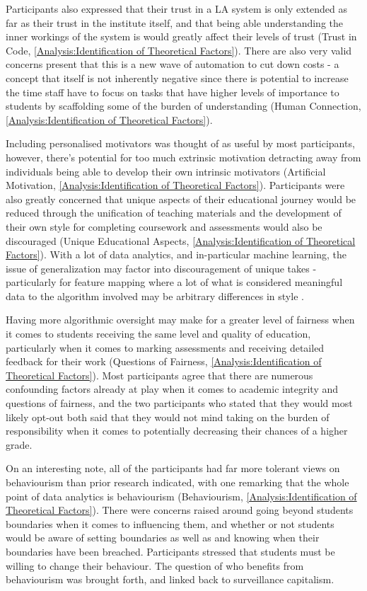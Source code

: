\documentclass{l4proj}
\begin{document}
Participants also expressed that their trust in a LA system is only extended as far as their trust in the institute itself, and that being able understanding the inner workings of the system is would greatly affect their levels of trust (Trust in Code, \ref{Analysis:Identification of Theoretical Factors}). There are also very valid concerns present that this is a new wave of automation to cut down costs - a concept that itself is not inherently negative since there is potential to increase the time staff have to focus on tasks that have higher levels of importance to students by scaffolding some of the burden of understanding (Human Connection, \ref{Analysis:Identification of Theoretical Factors}). 

Including personalised motivators was thought of as useful by most participants, however, there’s potential for too much extrinsic motivation detracting away from individuals  being able to develop their
own intrinsic motivators (Artificial Motivation, \ref{Analysis:Identification of Theoretical Factors}). Participants were also greatly concerned that unique aspects of their educational journey would be reduced through the unification of teaching materials and the development of their own style for completing coursework and assessments would also be discouraged (Unique Educational Aspects, \ref{Analysis:Identification of Theoretical Factors}). With a lot of data analytics, and in-particular machine learning, the issue of generalization may factor into discouragement of unique takes - particularly for feature mapping where a lot of what is considered meaningful data to the algorithm involved may be arbitrary differences in style \citep{zhang2021understanding}. 

Having more algorithmic oversight may make for a greater level of fairness when it comes to students receiving the same level and quality of education, particularly when it comes to marking assessments and receiving detailed feedback for their work (Questions of Fairness, \ref{Analysis:Identification of Theoretical Factors}). Most participants agree that there are numerous confounding factors already at play when it comes to academic integrity and questions of fairness, and the two participants who stated that they would most likely opt-out both said that they would not mind taking on the burden of responsibility when it comes to potentially decreasing their chances of a higher grade. 

On an interesting note, all of the participants had far more tolerant views on behaviourism than prior research indicated, with one remarking that the whole point of data analytics is behaviourism (Behaviourism, \ref{Analysis:Identification of Theoretical Factors}). There were concerns raised around going beyond students boundaries when it comes to influencing them, and whether or not students would be aware of setting boundaries as well as and knowing when their boundaries have been breached. Participants stressed that students must be willing to change their behaviour. The question of who benefits from behaviourism was brought forth, and linked back to surveillance capitalism. 
\end{document}
